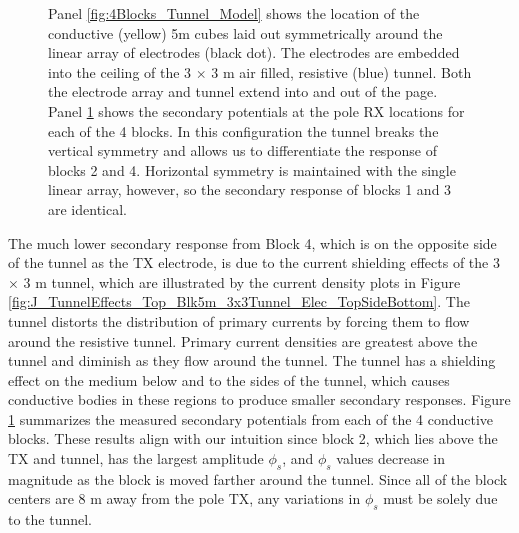 \documentclass[preprint,authoryear,12pt]{elsarticle}
\begin{document}
\begin{figure}[htp]
\begin{center}
\begin{subfigure}{0.59\linewidth}
         \caption{}
         \label{fig:4Blocks_Tunnel_Vs}
      \end{subfigure}
   \end{center}
\caption{Panel \ref{fig:4Blocks_Tunnel_Model} shows the location of the conductive (yellow) 5m cubes laid out symmetrically around the linear array of electrodes (black dot). The electrodes are embedded into the ceiling of the 3 $\times$ 3 m air filled, resistive (blue) tunnel. Both the electrode array and tunnel extend into and out of the page. Panel \ref{fig:4Blocks_Tunnel_Vs} shows the secondary potentials at the pole RX locations for each of the 4 blocks. In this configuration the tunnel breaks the vertical symmetry and allows us to differentiate the response of blocks 2 and 4. Horizontal symmetry is maintained with the single linear array, however, so the secondary response of blocks 1 and 3 are identical.}
\label{fig:4Blocks_Tunnel}
\end{figure}

The much lower secondary response from Block 4, which is on the opposite side of the tunnel as the TX electrode, is due to the current shielding effects of the 3 $\times$ 3 m tunnel, which are illustrated by the current density plots in Figure \ref{fig:J_TunnelEffects_Top_Blk5m_3x3Tunnel_Elec_TopSideBottom}. The tunnel distorts the distribution of primary currents by forcing them to flow around the resistive tunnel. Primary current densities are greatest above the tunnel and diminish as they flow around the tunnel. The tunnel has a shielding effect on the medium below and to the sides of the tunnel, which causes conductive bodies in these regions to produce smaller secondary responses. Figure \ref{fig:4Blocks_Tunnel_Vs} summarizes the measured secondary potentials from each of the 4 conductive blocks. These results align with our intuition since block 2, which lies above the TX and tunnel, has the largest amplitude $\phi_{s}$, and $\phi_{s}$ values decrease in magnitude as the block is moved farther around the tunnel. Since all of the block centers are 8 m away from the pole TX, any variations in $\phi_{s}$ must be solely due to the tunnel.
\end{document}
